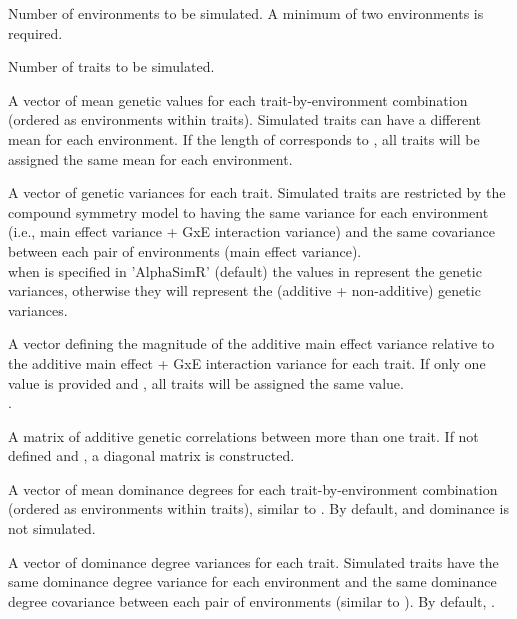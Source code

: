 \documentclass[a4paper]{book}
\begin{document}
\begin{Arguments}
\begin{ldescription}
\item[\code{n\_envs}] Number of environments to be simulated. A minimum of two environments is required.

\item[\code{n\_traits}] Number of traits to be simulated.

\item[\code{mean}] A vector of mean genetic values for each trait-by-environment combination (ordered
as environments within traits). Simulated traits can have a different mean for each
environment. If the length of  corresponds to , all traits will be
assigned the same mean for each environment.

\item[\code{var}] A vector of genetic variances for each trait. Simulated traits are restricted by the
compound symmetry model to having the same variance for each environment (i.e., main
effect variance + GxE interaction variance) and the same covariance between each pair of
environments (main effect variance). \\{}
 when  is specified in 'AlphaSimR' (default) the values in
 represent the  genetic variances, otherwise they will represent the
 (additive + non-additive) genetic variances.

\item[\code{rel\_main\_eff\_A}] A vector defining the magnitude of the additive main effect variance
relative to the additive main effect + GxE interaction variance for each trait. If only one
value is provided and , all traits will be assigned the same value. \\{}
 .

\item[\code{cor\_A}] A matrix of additive genetic correlations between more than one trait. If not
defined and , a diagonal matrix is constructed.

\item[\code{mean\_DD}] A vector of mean dominance degrees for each trait-by-environment combination
(ordered as environments within traits), similar to . By default,
 and dominance is not simulated.

\item[\code{var\_DD}] A vector of dominance degree variances for each trait. Simulated traits have the
same dominance degree variance for each environment and the same dominance degree covariance
between each pair of environments (similar to ). By default, .


\end{ldescription}
\end{Arguments}
\end{document}

